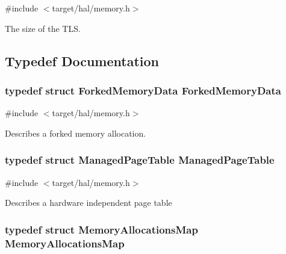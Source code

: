 {\ttfamily \#include $<$target/hal/memory.\+h$>$}

The size of the T\+LS. 

\subsection{Typedef Documentation}
\subsubsection[{\texorpdfstring{Forked\+Memory\+Data}{ForkedMemoryData}}]{\setlength{\rightskip}{0pt plus 5cm}typedef struct {\bf Forked\+Memory\+Data}  {\bf Forked\+Memory\+Data}}\hypertarget{group__memory__hal_gafcbcf8480ddd2494d17d17f196a27ca6}{}\label{group__memory__hal_gafcbcf8480ddd2494d17d17f196a27ca6}


{\ttfamily \#include $<$target/hal/memory.\+h$>$}

Describes a forked memory allocation. 
\subsubsection[{\texorpdfstring{Managed\+Page\+Table}{ManagedPageTable}}]{\setlength{\rightskip}{0pt plus 5cm}typedef struct {\bf Managed\+Page\+Table}  {\bf Managed\+Page\+Table}}\hypertarget{group__memory__hal_gad2397dbb839987d0753da093f7549f66}{}\label{group__memory__hal_gad2397dbb839987d0753da093f7549f66}


{\ttfamily \#include $<$target/hal/memory.\+h$>$}

Describes a hardware independent page table 
\subsubsection[{\texorpdfstring{Memory\+Allocations\+Map}{MemoryAllocationsMap}}]{\setlength{\rightskip}{0pt plus 5cm}typedef struct {\bf Memory\+Allocations\+Map}  {\bf Memory\+Allocations\+Map}}\hypertarget{group__memory__hal_ga91c66252a28d011008224fc4dc01885e}{}\label{group__memory__hal_ga91c66252a28d011008224fc4dc01885e}


